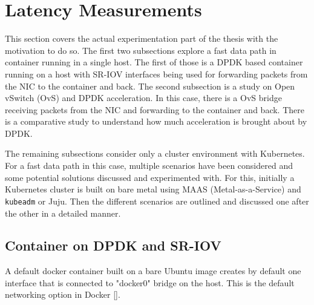 \documentclass[english, 12pt, a4paper, elec, utf8, a-1b, online]{aaltothesis}
\begin{document}
\clearpage
\section{Latency Measurements}
This section covers the actual experimentation part of the thesis with the motivation to do so. The first two subsections explore a fast data path in container running in a single host. The first of those is a DPDK based container running on a host with SR-IOV interfaces being used for forwarding packets from the NIC to the container and back. The second subsection is a study on Open vSwitch (OvS) and DPDK acceleration. In this case, there is a OvS bridge receiving packets from the NIC and forwarding to the container and back. There is a comparative study to understand how much acceleration is brought about by DPDK.

The remaining subsections consider only a cluster environment with Kubernetes. For a fast data path in this case, multiple scenarios have been considered and some potential solutions discussed and experimented with. For this, initially a Kubernetes cluster is built on bare metal using MAAS (Metal-as-a-Service) and \lstinline{kubeadm} or Juju. Then the different scenarios are outlined and discussed one after the other in a detailed manner.

\subsection{Container on DPDK and SR-IOV}
A default docker container built on a bare Ubuntu image creates by default one interface that is connected to "docker0" bridge on the host. This is the default networking option in Docker [].
\end{document}
